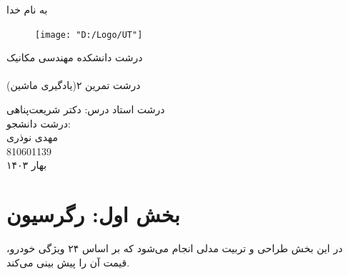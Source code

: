 \documentclass[11pt]{article}
\begin{document}
	به نام خدا\\
	\vspace{1cm}
	\begin{figure}[h]
		\begin{center}
			\texttt{[image: "D:/Logo/UT"]}
		\end{center}
	\end{figure}
	{‌درشت دانشکده مهندسی مکانیک}\\
	\vspace{1cm}
	{ }\\
	
	\vspace{0.5cm}
	{‌درشت تمرین ۲(یادگیری ماشین)}
	\vspace{1.5cm}
	
	\vspace{1.5cm}
	{‌درشت { استاد درس:} دکتر شریعت‌پناهی}\\
	\vspace{2cm}
	{‌درشت { دانشجو:}}\\
	{ مهدی نوذری\\
	810601139}\\
	\vspace{3cm}
	بهار ۱۴۰۳\\
	\pagebreak
	
	\section{بخش اول: رگرسیون}
	در این بخش طراحی و تربیت مدلی انجام می‌شود که بر اساس ۲۴ ویژگی خودرو، قیمت آن را پیش بینی می‌کند.
\end{document}
